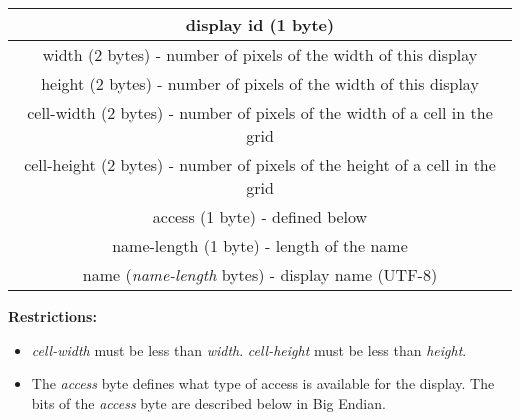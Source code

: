 \documentclass[11pt o]{article}
\begin{document}
    \begin{center}
        \begin{tabular}{|c|}
            \hline
            display id (1 byte)                                                          \\
            \hline
            width (2 bytes) - number of pixels of the width of this display              \\
            \hline
            height (2 bytes) - number of pixels of the width of this display             \\
            \hline
            cell-width (2 bytes) - number of pixels of the width of a cell in the grid   \\
            \hline
            cell-height (2 bytes) - number of pixels of the height of a cell in the grid \\
            \hline
            access (1 byte) - defined below                                              \\
            \hline
            name-length (1 byte) -  length of the name                                     \\
            \hline
            name (\emph{name-length} bytes) - display name (UTF-8)                       \\
            \hline
        \end{tabular}
    \end{center}

    \textbf{Restrictions:}

    \begin{itemize}
        \item \emph{cell-width} must be less than \emph{width}. \emph{cell-height} must be less than \emph{height}.\\ %
        \item The \emph{access} byte defines what type of access is available for the display. The bits of the \emph{access} byte are described below in Big Endian.
    \end{itemize}
\end{document}
